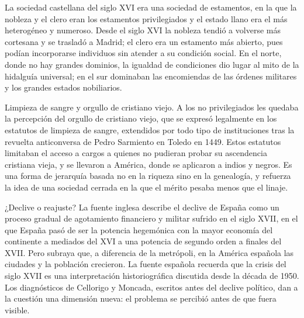 \documentclass{book}
\begin{document}
La sociedad castellana del siglo XVI era una sociedad de estamentos, en la que la nobleza y el clero eran los estamentos privilegiados y el estado llano era el más heterogéneo y numeroso. Desde el siglo XVI la nobleza tendió a volverse más cortesana y se trasladó a Madrid; el clero era un estamento más abierto, pues podían incorporarse individuos sin atender a su condición social. En el norte, donde no hay grandes dominios, la igualdad de condiciones dio lugar al mito de la hidalguía universal; en el sur dominaban las encomiendas de las órdenes militares y los grandes estados nobiliarios.


Limpieza de sangre y orgullo de cristiano viejo. A los no privilegiados les quedaba la percepción del orgullo de cristiano viejo, que se expresó legalmente en los estatutos de limpieza de sangre, extendidos por todo tipo de instituciones tras la revuelta anticonversa de Pedro Sarmiento en Toledo en 1449. Estos estatutos limitaban el acceso a cargos a quienes no pudieran probar su ascendencia cristiana vieja, y se llevaron a América, donde se aplicaron a indios y negros. Es una forma de jerarquía basada no en la riqueza sino en la genealogía, y refuerza la idea de una sociedad cerrada en la que el mérito pesaba menos que el linaje.


¿Declive o reajuste? La fuente inglesa describe el declive de España como un proceso gradual de agotamiento financiero y militar sufrido en el siglo XVII, en el que España pasó de ser la potencia hegemónica con la mayor economía del continente a mediados del XVI a una potencia de segundo orden a finales del XVII. Pero subraya que, a diferencia de la metrópoli, en la América española las ciudades y la población crecieron. La fuente española recuerda que la crisis del siglo XVII es una interpretación historiográfica discutida desde la década de 1950. Los diagnósticos de Cellorigo y Moncada, escritos antes del declive político, dan a la cuestión una dimensión nueva: el problema se percibió antes de que fuera visible.

\end{document}
